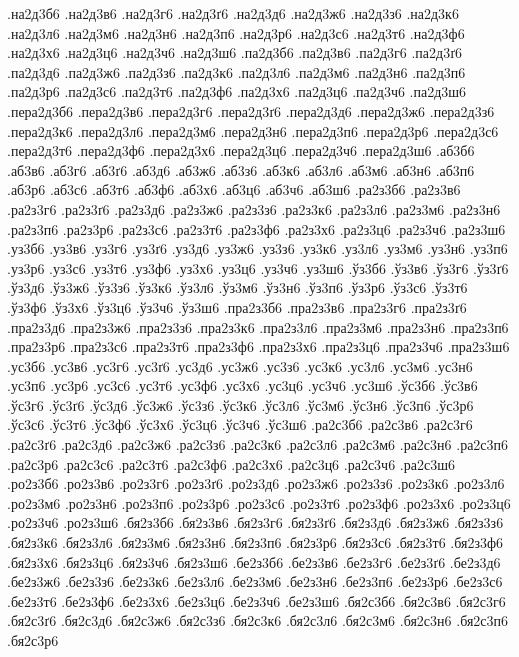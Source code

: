 {%
.на2д3б6
.на2д3в6
.на2д3г6
.на2д3ґ6
.на2д3д6
.на2д3ж6
.на2д3з6
.на2д3к6
.на2д3л6
.на2д3м6
.на2д3н6
.на2д3п6
.на2д3р6
.на2д3с6
.на2д3т6
.на2д3ф6
.на2д3х6
.на2д3ц6
.на2д3ч6
.на2д3ш6
.па2д3б6
.па2д3в6
.па2д3г6
.па2д3ґ6
.па2д3д6
.па2д3ж6
.па2д3з6
.па2д3к6
.па2д3л6
.па2д3м6
.па2д3н6
.па2д3п6
.па2д3р6
.па2д3с6
.па2д3т6
.па2д3ф6
.па2д3х6
.па2д3ц6
.па2д3ч6
.па2д3ш6
.пера2д3б6
.пера2д3в6
.пера2д3г6
.пера2д3ґ6
.пера2д3д6
.пера2д3ж6
.пера2д3з6
.пера2д3к6
.пера2д3л6
.пера2д3м6
.пера2д3н6
.пера2д3п6
.пера2д3р6
.пера2д3с6
.пера2д3т6
.пера2д3ф6
.пера2д3х6
.пера2д3ц6
.пера2д3ч6
.пера2д3ш6
.аб3б6
.аб3в6
.аб3г6
.аб3ґ6
.аб3д6
.аб3ж6
.аб3з6
.аб3к6
.аб3л6
.аб3м6
.аб3н6
.аб3п6
.аб3р6
.аб3с6
.аб3т6
.аб3ф6
.аб3х6
.аб3ц6
.аб3ч6
.аб3ш6
.ра2з3б6
.ра2з3в6
.ра2з3г6
.ра2з3ґ6
.ра2з3д6
.ра2з3ж6
.ра2з3з6
.ра2з3к6
.ра2з3л6
.ра2з3м6
.ра2з3н6
.ра2з3п6
.ра2з3р6
.ра2з3с6
.ра2з3т6
.ра2з3ф6
.ра2з3х6
.ра2з3ц6
.ра2з3ч6
.ра2з3ш6
.уз3б6
.уз3в6
.уз3г6
.уз3ґ6
.уз3д6
.уз3ж6
.уз3з6
.уз3к6
.уз3л6
.уз3м6
.уз3н6
.уз3п6
.уз3р6
.уз3с6
.уз3т6
.уз3ф6
.уз3х6
.уз3ц6
.уз3ч6
.уз3ш6
.ўз3б6
.ўз3в6
.ўз3г6
.ўз3ґ6
.ўз3д6
.ўз3ж6
.ўз3з6
.ўз3к6
.ўз3л6
.ўз3м6
.ўз3н6
.ўз3п6
.ўз3р6
.ўз3с6
.ўз3т6
.ўз3ф6
.ўз3х6
.ўз3ц6
.ўз3ч6
.ўз3ш6
.пра2з3б6
.пра2з3в6
.пра2з3г6
.пра2з3ґ6
.пра2з3д6
.пра2з3ж6
.пра2з3з6
.пра2з3к6
.пра2з3л6
.пра2з3м6
.пра2з3н6
.пра2з3п6
.пра2з3р6
.пра2з3с6
.пра2з3т6
.пра2з3ф6
.пра2з3х6
.пра2з3ц6
.пра2з3ч6
.пра2з3ш6
.ус3б6
.ус3в6
.ус3г6
.ус3ґ6
.ус3д6
.ус3ж6
.ус3з6
.ус3к6
.ус3л6
.ус3м6
.ус3н6
.ус3п6
.ус3р6
.ус3с6
.ус3т6
.ус3ф6
.ус3х6
.ус3ц6
.ус3ч6
.ус3ш6
.ўс3б6
.ўс3в6
.ўс3г6
.ўс3ґ6
.ўс3д6
.ўс3ж6
.ўс3з6
.ўс3к6
.ўс3л6
.ўс3м6
.ўс3н6
.ўс3п6
.ўс3р6
.ўс3с6
.ўс3т6
.ўс3ф6
.ўс3х6
.ўс3ц6
.ўс3ч6
.ўс3ш6
.ра2с3б6
.ра2с3в6
.ра2с3г6
.ра2с3ґ6
.ра2с3д6
.ра2с3ж6
.ра2с3з6
.ра2с3к6
.ра2с3л6
.ра2с3м6
.ра2с3н6
.ра2с3п6
.ра2с3р6
.ра2с3с6
.ра2с3т6
.ра2с3ф6
.ра2с3х6
.ра2с3ц6
.ра2с3ч6
.ра2с3ш6
.ро2з3б6
.ро2з3в6
.ро2з3г6
.ро2з3ґ6
.ро2з3д6
.ро2з3ж6
.ро2з3з6
.ро2з3к6
.ро2з3л6
.ро2з3м6
.ро2з3н6
.ро2з3п6
.ро2з3р6
.ро2з3с6
.ро2з3т6
.ро2з3ф6
.ро2з3х6
.ро2з3ц6
.ро2з3ч6
.ро2з3ш6
.бя2з3б6
.бя2з3в6
.бя2з3г6
.бя2з3ґ6
.бя2з3д6
.бя2з3ж6
.бя2з3з6
.бя2з3к6
.бя2з3л6
.бя2з3м6
.бя2з3н6
.бя2з3п6
.бя2з3р6
.бя2з3с6
.бя2з3т6
.бя2з3ф6
.бя2з3х6
.бя2з3ц6
.бя2з3ч6
.бя2з3ш6
.бе2з3б6
.бе2з3в6
.бе2з3г6
.бе2з3ґ6
.бе2з3д6
.бе2з3ж6
.бе2з3з6
.бе2з3к6
.бе2з3л6
.бе2з3м6
.бе2з3н6
.бе2з3п6
.бе2з3р6
.бе2з3с6
.бе2з3т6
.бе2з3ф6
.бе2з3х6
.бе2з3ц6
.бе2з3ч6
.бе2з3ш6
.бя2с3б6
.бя2с3в6
.бя2с3г6
.бя2с3ґ6
.бя2с3д6
.бя2с3ж6
.бя2с3з6
.бя2с3к6
.бя2с3л6
.бя2с3м6
.бя2с3н6
.бя2с3п6
.бя2с3р6
}
